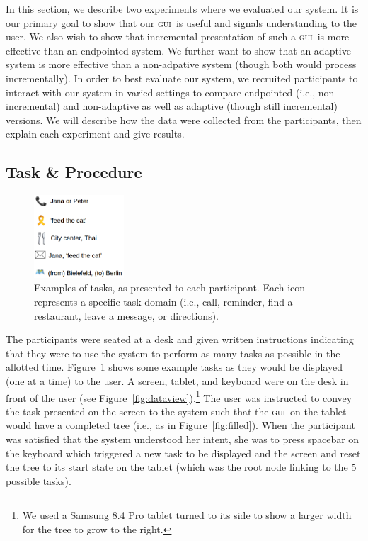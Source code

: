 \documentclass[11pt]{article}
\newcommand{\ui}[0]{\textsc{gui}}
\begin{document}
In this section, we describe two experiments where we evaluated our system. It is our primary goal to show that our \ui\ is useful and signals understanding to the user. We also wish to show that incremental presentation of such a \ui\ is more effective than an endpointed system. We further want to show that an adaptive system is more effective than a non-adpative system (though both would process incrementally). In order to best evaluate our system, we recruited participants to interact with our system in varied settings to compare endpointed (i.e., non-incremental) and non-adaptive as well as adaptive (though still incremental) versions. We will describe how the data were collected from the participants, then explain each experiment and give results.

\subsection{Task \& Procedure} 


\begin{figure}
  \centering
      \includegraphics[width=0.3\textwidth]{figures/taskexample.png}	
      \caption{Examples of tasks, as presented to each participant. Each icon represents a specific task domain (i.e., call, reminder, find a restaurant, leave a message, or directions).\label{fig:taskex}}
\end{figure}

The participants were seated at a desk and given written instructions indicating that they were to use the system to perform as many tasks as possible in the allotted time. Figure~\ref{fig:taskex} shows some example tasks as they would be displayed (one at a time) to the user. A screen, tablet, and keyboard were on the desk in front of the user (see Figure~\ref{fig:dataview}).\footnote{We used a Samsung 8.4 Pro tablet turned to its side to show a larger width for the tree to grow to the right.} The user was instructed to convey the task presented on the screen to the system such that the \ui\ on the tablet would have a completed tree (i.e., as in Figure~\ref{fig:filled}). When the participant was satisfied that the system understood her intent, she was to press spacebar on the keyboard which triggered a new task to be displayed and the screen and reset the tree to its start state on the tablet (which was the root node linking to the 5 possible tasks). 
\end{document}
